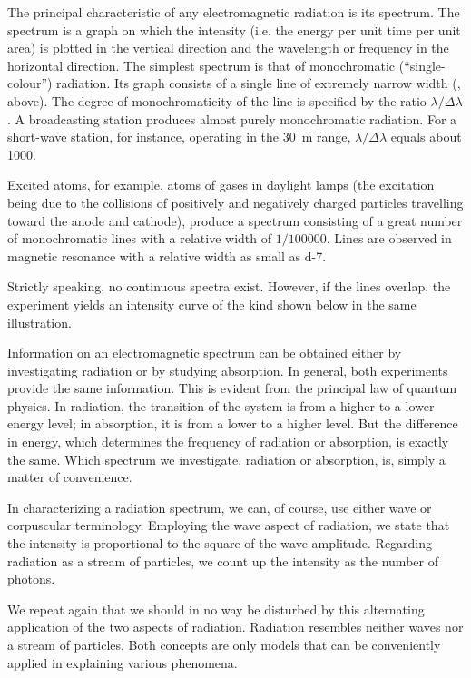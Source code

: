 The principal characteristic of any electromagnetic radiation is its spectrum. The spectrum is a graph on which the intensity (i.e. the energy per unit time per unit area) is plotted in the vertical direction and the wavelength or frequency in the horizontal direction. The simplest spectrum is that of monochromatic (``single-colour'') radiation. Its graph consists of a single line of extremely narrow width (, above). The degree of monochromaticity of the line is specified by the ratio $\lambda/\Delta \lambda$. A broadcasting station produces almost purely monochromatic radiation. For a short-wave station, for instance, operating in the \SI{30}{\meter} range, $\lambda/\Delta \lambda$ equals about 1000.

Excited atoms, for example, atoms of gases in daylight lamps (the excitation being due to the collisions of positively and negatively charged particles travelling toward the anode and cathode), produce a spectrum consisting of a great number of monochromatic lines with a relative width of $1/100000$. Lines are observed in magnetic resonance with a relative width as small as \num{d-7}.


Strictly speaking, no continuous spectra exist. However, if the lines overlap, the experiment yields an intensity curve of the kind shown below in the same illustration.

Information on an electromagnetic spectrum can be obtained either by investigating radiation or by studying absorption. In general, both experiments provide the same information. This is evident from the principal law of quantum physics. In radiation, the transition of the system is from a higher to a lower energy level; in absorption, it is from a lower to a higher level. But the difference in energy, which determines the frequency of radiation or absorption, is exactly the same. Which spectrum we investigate, radiation or absorption, is, simply a matter of convenience.

In characterizing a radiation spectrum, we can, of course, use either wave or corpuscular terminology. Employing the wave aspect of radiation, we state that the intensity is proportional to the square of the wave amplitude. Regarding radiation as a stream of particles, we count up the intensity as the number of photons.

We repeat again that we should in no way be disturbed by this alternating application of the two aspects of radiation. Radiation resembles neither waves nor a stream of particles. Both concepts are only models that can be conveniently applied in explaining various phenomena.

